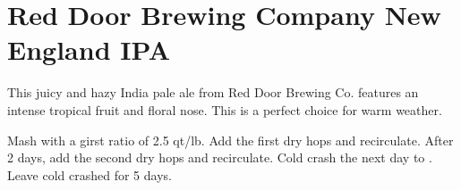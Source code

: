 \documentclass[10pt,oneside]{scrbook}
\begin{document}
\begin{ingredientsblock}

\begin{malts}
\end{malts}

\begin{hops}
\end{hops}

\begin{yeasts}
\end{yeasts}

\end{ingredientsblock}

\chapter*{Red Door Brewing Company New England IPA}

\begin{aboutblock}
This juicy and hazy India pale ale from Red Door Brewing Co. features an intense tropical
fruit and floral nose. This is a perfect choice for warm weather.
\end{aboutblock}


\begin{methodandtiming}
 
\begin{mashsteps}
\end{mashsteps}

\begin{fermentationsteps}
\end{fermentationsteps}

\begin{directions}
Mash with a girst ratio of 2.5 qt/lb. Add the first dry hops and recirculate. After 2 days,
add the second dry hops and recirculate. Cold crash the next day to . Leave cold
crashed for 5 days.
\end{directions}

\end{methodandtiming}
\end{document}
